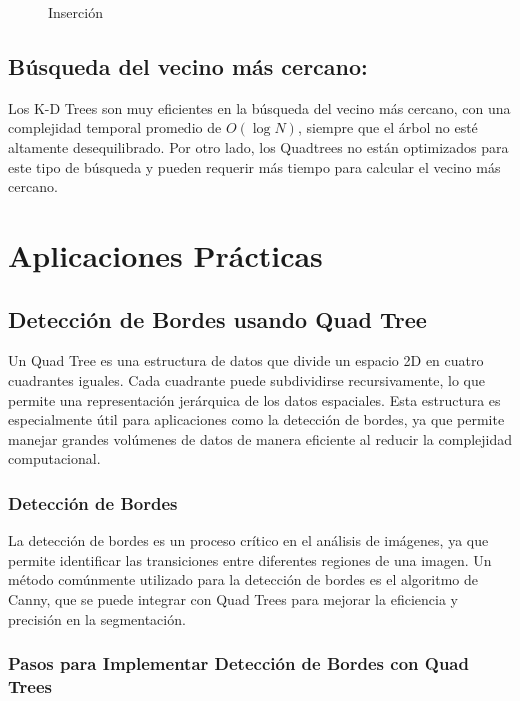 \documentclass[9pt,a4paper,twoside]{rho-class/rho}
\begin{document}
\begin{itemize}
\begin{figure}[h]
                    \caption{Inserción \cite{amay12_spatialsearch}}
                    \label{fig:representation_figure}
                \end{figure}
            \end{itemize}
        
        \subsection*{Búsqueda del vecino más cercano:}
            Los K-D Trees son muy eficientes en la búsqueda del vecino más cercano, con una complejidad temporal promedio de $O(\log N)$, siempre que el árbol no esté altamente desequilibrado. Por otro lado, los Quadtrees no están optimizados para este tipo de búsqueda y pueden requerir más tiempo para calcular el vecino más cercano.\\
    \section{Aplicaciones Prácticas}
        \subsection{Detección de Bordes usando Quad Tree}

        Un Quad Tree es una estructura de datos que divide un espacio 2D en cuatro cuadrantes iguales. Cada cuadrante puede subdividirse recursivamente, lo que permite una representación jerárquica de los datos espaciales. Esta estructura es especialmente útil para aplicaciones como la detección de bordes, ya que permite manejar grandes volúmenes de datos de manera eficiente al reducir la complejidad computacional.
        
            \subsubsection{Detección de Bordes}
            
            La detección de bordes es un proceso crítico en el análisis de imágenes, ya que permite identificar las transiciones entre diferentes regiones de una imagen. Un método comúnmente utilizado para la detección de bordes es el algoritmo de Canny, que se puede integrar con Quad Trees para mejorar la eficiencia y precisión en la segmentación.
            
            \subsubsection{Pasos para Implementar Detección de Bordes con Quad Trees}
            
\end{document}
